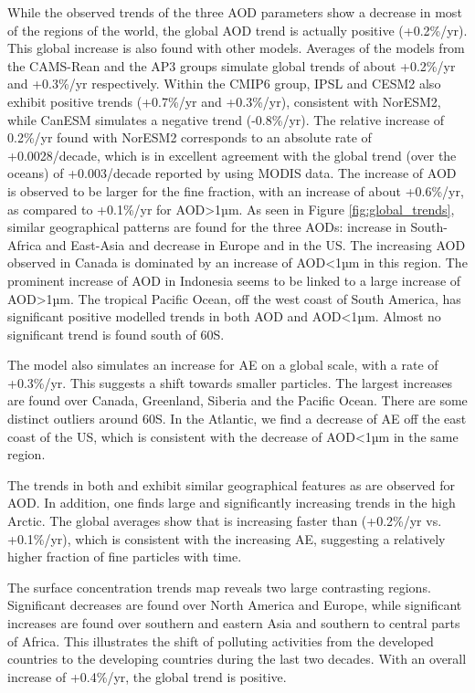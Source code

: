 \documentclass[acp, manuscript]{copernicus}
\begin{document}
While the observed trends of the three AOD parameters show a decrease in most of the regions of the world, the global AOD trend is actually positive (+0.2\%/yr). This global increase is also found with other models. Averages of the models from the CAMS-Rean and the AP3 groups simulate global trends of about +0.2\%/yr and +0.3\%/yr respectively. Within the CMIP6 group, IPSL and CESM2 also exhibit positive trends (+0.7\%/yr and +0.3\%/yr), consistent with NorESM2, while CanESM simulates a negative trend (-0.8\%/yr). The relative increase of 0.2\%/yr found with NorESM2 corresponds to an absolute rate of +0.0028/decade, which is in excellent agreement with the global trend (over the oceans) of +0.003/decade reported by \cite{zhang2010decadal} using MODIS data. The increase of AOD is observed to be larger for the fine fraction, with an increase of about +0.6\%/yr, as compared to +0.1\%/yr for AOD>1µm. As seen in Figure \ref{fig:global_trends}, similar geographical patterns are found for the three AODs: increase in South-Africa and East-Asia and decrease in Europe and in the US. The increasing AOD observed in Canada is dominated by an increase of AOD<1µm in this region. The prominent increase of AOD in Indonesia seems to be linked to a large increase of AOD>1µm. The tropical Pacific Ocean, off the west coast of South America, has significant positive modelled trends in both AOD and AOD<1µm. Almost no significant trend is found south of 60\textdegree S.

The model also simulates an increase for AE on a global scale, with a rate of +0.3\%/yr. This suggests a shift towards smaller particles. The largest increases are found over Canada, Greenland, Siberia and the Pacific Ocean. There are some distinct outliers around 60\textdegree S. In the Atlantic, we find a decrease of AE off the east coast of the US, which is consistent with the decrease of AOD<1µm in the same region.

The trends in both  and  exhibit similar geographical features as are observed for AOD. In addition, one finds large and significantly increasing trends in the high Arctic. The global averages show that  is increasing faster than   (+0.2\%/yr vs. +0.1\%/yr), which is consistent with the increasing AE, suggesting a relatively higher fraction of fine particles with time.

The surface  concentration trends map reveals two large contrasting regions. Significant decreases are found over North America and Europe, while significant increases are found over southern and eastern Asia and southern to central parts of Africa. This illustrates the shift of polluting activities from the developed countries to the developing countries during the last two decades. With an overall increase of +0.4\%/yr, the global trend is positive.
\end{document}
